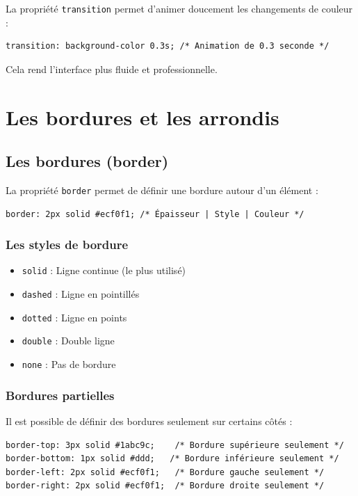 \documentclass[12pt,a4paper]{article}
\begin{document}
La propriété \texttt{transition} permet d'animer doucement les changements de couleur :

\begin{lstlisting}
transition: background-color 0.3s; /* Animation de 0.3 seconde */
\end{lstlisting}

Cela rend l'interface plus fluide et professionnelle.

\section{Les bordures et les arrondis}

\subsection{Les bordures (border)}

La propriété \texttt{border} permet de définir une bordure autour d'un élément :

\begin{lstlisting}[style=CSS]
border: 2px solid #ecf0f1; /* Épaisseur | Style | Couleur */
\end{lstlisting}

\subsubsection{Les styles de bordure}

\begin{itemize}
\item \texttt{solid} : Ligne continue (le plus utilisé)
\item \texttt{dashed} : Ligne en pointillés
\item \texttt{dotted} : Ligne en points
\item \texttt{double} : Double ligne
\item \texttt{none} : Pas de bordure
\end{itemize}

\subsubsection{Bordures partielles}

Il est possible de définir des bordures seulement sur certains côtés :

\begin{lstlisting}[style=CSS]
border-top: 3px solid #1abc9c;    /* Bordure supérieure seulement */
border-bottom: 1px solid #ddd;   /* Bordure inférieure seulement */
border-left: 2px solid #ecf0f1;   /* Bordure gauche seulement */
border-right: 2px solid #ecf0f1;  /* Bordure droite seulement */
\end{lstlisting}
\end{document}
